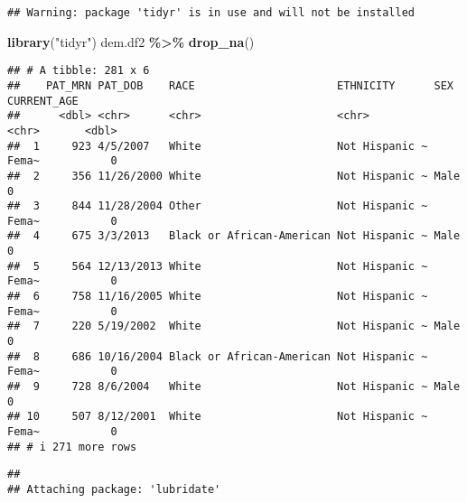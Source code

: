 \documentclass[
]{article}
\newenvironment{Shaded}{\begin{snugshade}}{\end{snugshade}}
\newcommand{\CommentTok}[1]{\textcolor[rgb]{0.56,0.35,0.01}{\textit{#1}}}
\newcommand{\FunctionTok}[1]{\textcolor[rgb]{0.13,0.29,0.53}{\textbf{#1}}}
\newcommand{\NormalTok}[1]{#1}
\newcommand{\OtherTok}[1]{\textcolor[rgb]{0.56,0.35,0.01}{#1}}
\newcommand{\SpecialCharTok}[1]{\textcolor[rgb]{0.81,0.36,0.00}{\textbf{#1}}}
\newcommand{\StringTok}[1]{\textcolor[rgb]{0.31,0.60,0.02}{#1}}
\begin{document}
\begin{verbatim}
## Warning: package 'tidyr' is in use and will not be installed
\end{verbatim}

\begin{Shaded}
\begin{Highlighting}[]
\FunctionTok{library}\NormalTok{(}\StringTok{"tidyr"}\NormalTok{)}
\NormalTok{dem.df2 }\SpecialCharTok{\%\textgreater{}\%} \FunctionTok{drop\_na}\NormalTok{()}
\end{Highlighting}
\end{Shaded}

\begin{verbatim}
## # A tibble: 281 x 6
##    PAT_MRN PAT_DOB    RACE                      ETHNICITY      SEX   CURRENT_AGE
##      <dbl> <chr>      <chr>                     <chr>          <chr>       <dbl>
##  1     923 4/5/2007   White                     Not Hispanic ~ Fema~           0
##  2     356 11/26/2000 White                     Not Hispanic ~ Male            0
##  3     844 11/28/2004 Other                     Not Hispanic ~ Fema~           0
##  4     675 3/3/2013   Black or African-American Not Hispanic ~ Male            0
##  5     564 12/13/2013 White                     Not Hispanic ~ Fema~           0
##  6     758 11/16/2005 White                     Not Hispanic ~ Fema~           0
##  7     220 5/19/2002  White                     Not Hispanic ~ Male            0
##  8     686 10/16/2004 Black or African-American Not Hispanic ~ Fema~           0
##  9     728 8/6/2004   White                     Not Hispanic ~ Male            0
## 10     507 8/12/2001  White                     Not Hispanic ~ Fema~           0
## # i 271 more rows
\end{verbatim}

\begin{Shaded}
\end{Shaded}

\begin{verbatim}
## 
## Attaching package: 'lubridate'
\end{verbatim}
\end{document}
